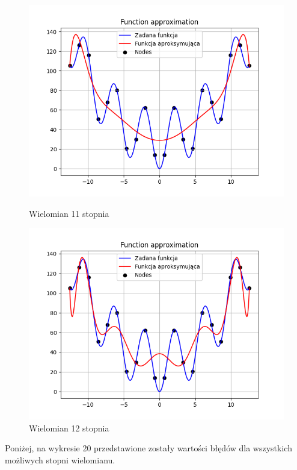 \documentclass{article}
\begin{document}
\begin{figure}[H]
\begin{minipage}[b]{0.49\textwidth}
    \begin{minipage}[b]{\textwidth}
      \includegraphics[width=\textwidth]{img18.png}
      \caption{Wielomian 11 stopnia}
    \end{minipage}
    \vspace*{\fill}
    \begin{minipage}[b]{\textwidth}
      \includegraphics[width=\textwidth]{img19.png}
      \caption{Wielomian 12 stopnia}
    \end{minipage}
  \end{minipage}
\end{figure}

Poniżej, na wykresie 20 przedstawione zostały wartości błędów dla wszystkich możliwych stopni wielomianu.
\end{document}
